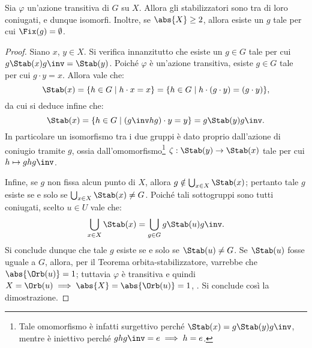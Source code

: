 \documentclass[12pt]{scrartcl}
\begin{document}
	\begin{proposition} %
		Sia $\varphi$ un'azione transitiva di $G$ su $X$. Allora gli stabilizzatori sono
		tra di loro coniugati, e dunque isomorfi. Inoltre, se $\abs{X} \geq 2$, allora
		esiste un $g$ tale per cui $\Fix(g) = \emptyset$.
	\end{proposition}
	
	\begin{proof}
		Siano $x$, $y \in X$. Si verifica innanzitutto che esiste un $g \in G$ tale per cui
		$g \Stab(x) g\inv = \Stab(y)$. Poiché $\varphi$ è un'azione transitiva,
		esiste $g \in G$ tale per cui $g \cdot y = x$. Allora vale che:
		\[ \Stab(x) = \{ h \in G \mid h \cdot x = x \} = \{ h \in G \mid h \cdot (g \cdot y) = (g \cdot y) \}, \]
		da cui si deduce infine che:
		\[ \Stab(x) = \{ h \in G \mid (g\inv h g) \cdot y = y \} = g \Stab(y) g\inv. \]
		In particolare un isomorfismo tra i due gruppi è dato proprio dall'azione di
		coniugio tramite $g$, ossia dall'omomorfismo\footnote{
			Tale omomorfismo è infatti surgettivo perché $\Stab(x) = g\Stab(y)g\inv$,
			mentre è iniettivo perché $ghg\inv = e \implies h = e$.
		} $\zeta : \Stab(y) \to \Stab(x)$
		tale per cui $h \mapsto ghg\inv$. \medskip
		
		
		Infine, se $g$ non fissa alcun punto di $X$, allora $g \notin \bigcup_{x \in X} \Stab(x)$; pertanto tale $g$ esiste se e solo se $\bigcup_{x \in X} \Stab(x) \neq G$. Poiché tali sottogruppi sono tutti coniugati, scelto $u \in U$ vale
		che:
		\[ \bigcup_{x \in X} \Stab(x) = \bigcup_{g \in G} g \Stab(u) g\inv. \]
		Si conclude dunque che tale $g$ esiste se e solo se $\Stab(u) \neq G$.
		Se $\Stab(u)$ fosse uguale a $G$, allora, per il Teorema orbita-stabilizzatore,
		varrebbe che $\abs{\Orb(u)} = 1$; tuttavia $\varphi$ è transitiva e quindi
		$X = \Orb(u) \implies \abs{X} = \abs{\Orb(u)} = 1$, \Lightning. Si conclude
		così la dimostrazione.
	\end{proof}
\end{document}
